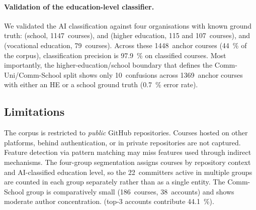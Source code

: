 \paragraph{Validation of the education-level classifier.}
We validated the AI classification against four organisations with
known ground truth: \mintgroup{} (school, \num{1147}~courses),
 and  (higher
education, \num{115} and \num{107}~courses), and
 (vocational education,
\num{79}~courses).
Across these \num{1448}~anchor courses (\SI{44}{\percent} of the
corpus), classification precision is \SI{97.9}{\percent} on classified
courses.
Most importantly, the higher-education/school boundary that defines
the Comm-Uni/Comm-School split shows only \num{10}~confusions across
\num{1369}~anchor courses with either an HE or a school ground truth
(\SI{0.7}{\percent} error rate).

\subsection{Limitations}

The corpus is restricted to \emph{public} GitHub repositories.
Courses hosted on other platforms, behind authentication, or in private
repositories are not captured.
Feature detection via pattern matching may miss features used through
indirect mechanisms.
The four-group segmentation assigns courses by repository context
and AI-classified education level,
so the 22~committers active in multiple groups are counted in each
group separately rather than as a single entity.
The Comm-School group is comparatively small (\num{186}~courses,
\num{38}~accounts) and shows moderate author concentration.
(top-3 accounts contribute \SI{44.1}{\percent}).
